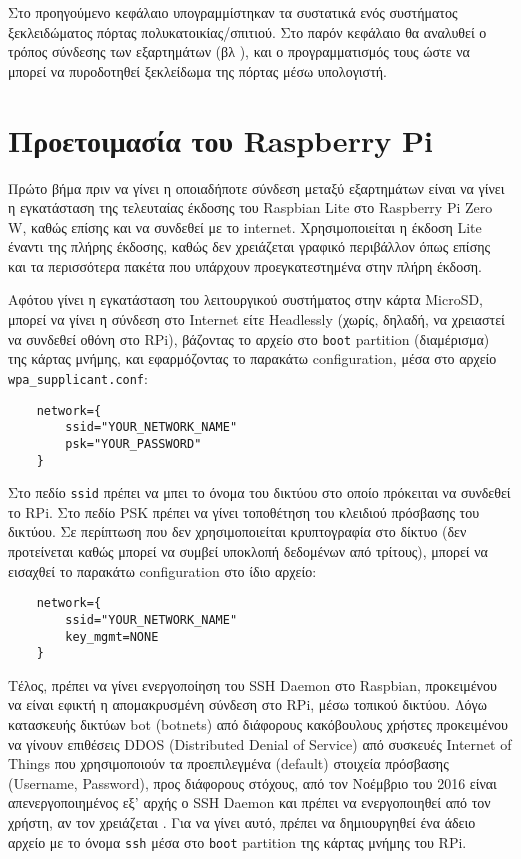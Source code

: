 Στο προηγούμενο κεφάλαιο υπογραμμίστηκαν τα συστατικά ενός συστήματος ξεκλειδώματος πόρτας πολυκατοικίας/σπιτιού. Στο παρόν κεφάλαιο θα αναλυθεί ο τρόπος σύνδεσης των εξαρτημάτων (βλ ), και ο προγραμματισμός τους ώστε να μπορεί να πυροδοτηθεί ξεκλείδωμα της πόρτας μέσω υπολογιστή.

\section{Προετοιμασία του Raspberry Pi}
	Πρώτο βήμα πριν να γίνει η οποιαδήποτε σύνδεση μεταξύ εξαρτημάτων είναι να γίνει η εγκατάσταση της τελευταίας έκδοσης του Raspbian Lite στο Raspberry Pi Zero W, καθώς επίσης και να συνδεθεί με το internet. Χρησιμοποιείται η έκδοση Lite έναντι της πλήρης έκδοσης, καθώς δεν χρειάζεται γραφικό περιβάλλον όπως επίσης και τα περισσότερα πακέτα που υπάρχουν προεγκατεστημένα στην πλήρη έκδοση.

	Αφότου γίνει η εγκατάσταση του λειτουργικού συστήματος στην κάρτα MicroSD, μπορεί να γίνει η σύνδεση στο Internet είτε Headlessly (χωρίς, δηλαδή, να χρειαστεί να συνδεθεί οθόνη στο RPi), βάζοντας το αρχείο στο \verb|boot| partition (διαμέρισμα) της κάρτας μνήμης, και εφαρμόζοντας το παρακάτω configuration, μέσα στο αρχείο \verb|wpa_supplicant.conf|\textsuperscript{\cite{rpi_wifi_headless}}:

	\begin{lstlisting}
	network={
		ssid="YOUR_NETWORK_NAME"
		psk="YOUR_PASSWORD"
	}\end{lstlisting} 

	Στο πεδίο \verb|ssid| πρέπει να μπει το όνομα του δικτύου στο οποίο πρόκειται να συνδεθεί το RPi. Στο πεδίο PSK πρέπει να γίνει τοποθέτηση του κλειδιού πρόσβασης του δικτύου. Σε περίπτωση που δεν χρησιμοποιείται κρυπτογραφία στο δίκτυο (δεν προτείνεται καθώς μπορεί να συμβεί υποκλοπή δεδομένων από τρίτους), μπορεί να εισαχθεί το παρακάτω configuration στο ίδιο αρχείο:

	\begin{lstlisting}
	network={
		ssid="YOUR_NETWORK_NAME"
		key_mgmt=NONE
	}\end{lstlisting} 

	Τέλος, πρέπει να γίνει ενεργοποίηση του SSH Daemon στο Raspbian, προκειμένου να είναι εφικτή η απομακρυσμένη σύνδεση στο RPi, μέσω τοπικού δικτύου. Λόγω κατασκευής δικτύων bot (botnets) από διάφορους κακόβουλους χρήστες προκειμένου να γίνουν επιθέσεις DDOS (Distributed Denial of Service) από συσκευές Internet of Things που χρησιμοποιούν τα προεπιλεγμένα (default) στοιχεία πρόσβασης (Username, Password), προς διάφορους στόχους, από τον Νοέμβριο του 2016 είναι απενεργοποιημένος εξ' αρχής ο SSH Daemon και πρέπει να ενεργοποιηθεί από τον χρήστη, αν τον χρειάζεται . Για να γίνει αυτό, πρέπει να δημιουργηθεί ένα άδειο αρχείο με το όνομα \verb|ssh| μέσα στο \verb|boot| partition της κάρτας μνήμης του RPi.

